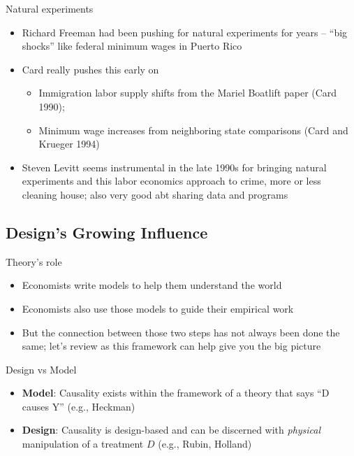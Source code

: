 \documentclass{beamer}
\begin{document}
\begin{frame}{Natural experiments}

\begin{itemize}
\item Richard Freeman had been pushing for natural experiments for years -- ``big shocks'' like federal minimum wages in Puerto Rico
\item Card really pushes this early on 
	\begin{itemize}
	\item Immigration labor supply shifts from the Mariel Boatlift paper (Card 1990); 
	\item Minimum wage increases from neighboring state comparisons (Card and Krueger 1994)
	\end{itemize}
\item Steven Levitt seems instrumental in the late 1990s for bringing natural experiments and this labor economics approach to crime, more or less cleaning house; also very good abt sharing data and programs

\end{itemize}

\end{frame}

\subsection{Design's Growing Influence}

\begin{frame}{Theory's role}

\begin{itemize}
\item Economists write models to help them understand the world
\item Economists also use those models to guide their empirical work
\item But the connection between those two steps has not always been done the same; let's review as this framework can help give you the big picture
\end{itemize}

\end{frame}


\begin{frame}{Design vs Model}

  \begin{itemize}
    \item \textbf{Model}: Causality exists within the framework of a theory that says ``D causes Y'' (e.g., Heckman)
    \item \textbf{Design}: Causality is design-based and can be discerned with \emph{physical} manipulation of a treatment $D$ (e.g., Rubin, Holland)
  \end{itemize}
\end{frame}
\end{document}
